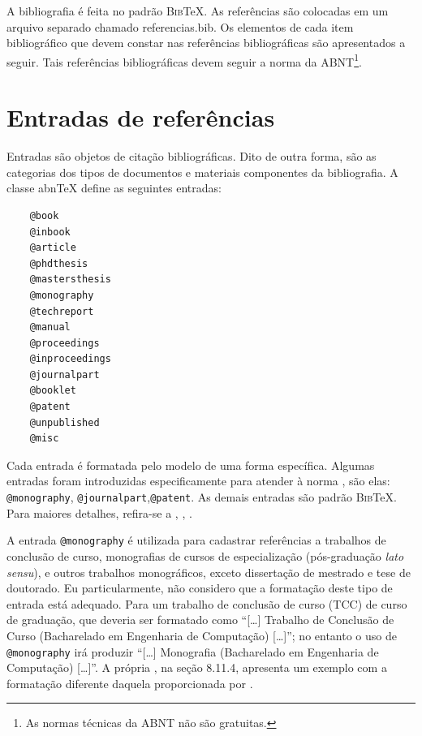\begin{apendicesenv}
    A bibliografia é feita no padrão \textsc{Bib}\TeX{}.
    As referências são colocadas em um arquivo separado chamado {\ttfamily referencias.bib}.
    Os elementos de cada item bibliográfico que devem constar nas referências bibliográficas são apresentados a seguir.
    Tais referências bibliográficas devem seguir a norma  da ABNT\footnote{As normas técnicas da ABNT não são gratuitas.}.

    \section{Entradas de referências}
    \label{sec_entradas_de_referencias}

    Entradas são objetos de citação bibliográficas.
    Dito de outra forma, são as categorias dos tipos de documentos e materiais componentes da bibliografia.
    A classe abn\TeX{} define as seguintes entradas:

    \begin{verbatim}
    @book
    @inbook
    @article
    @phdthesis
    @mastersthesis
    @monography
    @techreport
    @manual
    @proceedings
    @inproceedings
    @journalpart
    @booklet
    @patent
    @unpublished
    @misc
\end{verbatim}

    Cada entrada é formatada pelo modelo de uma forma específica.
    Algumas entradas foram introduzidas especificamente para atender à norma , são elas: \verb|@monography|, \verb|@journalpart|,\verb|@patent|.
    As demais entradas são padrão \textsc{Bib}\TeX{}.
    Para maiores detalhes, refira-se a , , .

    A entrada \verb|@monography| é utilizada para cadastrar referências a trabalhos de conclusão de curso, monografias de cursos de especialização (pós-graduação \textit{lato sensu}), e outros trabalhos monográficos, exceto dissertação de mestrado e tese de doutorado.
    Eu particularmente, não considero que a formatação deste tipo de entrada está adequado.
    Para um trabalho de conclusão de curso (TCC) de curso de graduação, que deveria ser formatado como ``[\ldots] Trabalho de Conclusão de Curso (Bacharelado em Engenharia de Computação) [\ldots]''; no entanto o uso de \verb|@monography| irá produzir ``[\ldots] Monografia (Bacharelado em Engenharia de Computação) [\ldots]''.
    A própria  , na seção 8.11.4, apresenta um exemplo com a formatação diferente daquela proporcionada por .


\end{apendicesenv}
